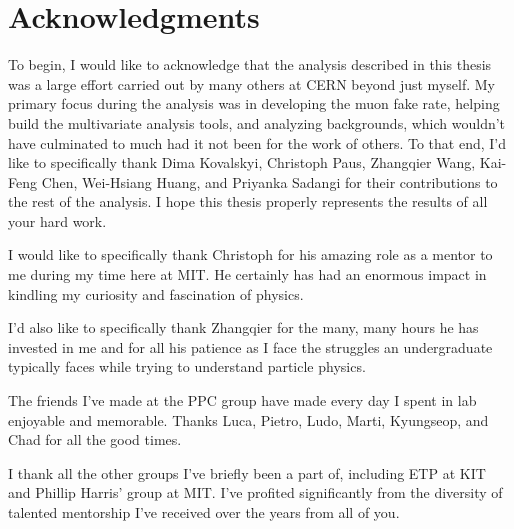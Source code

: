 


\chapter*{Acknowledgments}

To begin, I would like to acknowledge that the analysis described in this thesis was a large effort carried out by many others at CERN beyond just myself. My primary focus during the analysis was in developing the muon fake rate, helping build the multivariate analysis tools, and analyzing backgrounds, which wouldn't have culminated to much had it not been for the work of others. To that end, I'd like to specifically thank Dima Kovalskyi, Christoph Paus, Zhangqier Wang, Kai-Feng Chen, Wei-Hsiang Huang, and Priyanka Sadangi for their contributions to the rest of the analysis. I hope this thesis properly represents the results of all your hard work. 

\vspace{5mm}

I would like to specifically thank Christoph for his amazing role as a mentor to me during my time here at MIT. He certainly has had an enormous impact in kindling my curiosity and fascination of physics. 

\vspace{5mm}

I'd also like to specifically thank Zhangqier for the many, many hours he has invested in me and for all his patience as I face the struggles an undergraduate typically faces while trying to understand particle physics. 

\vspace{5mm}

The friends I've made at the PPC group have made every day I spent in lab enjoyable and memorable. Thanks Luca, Pietro, Ludo, Marti, Kyungseop, and Chad for all the good times.

\vspace{5mm}

I thank all the other groups I've briefly been a part of, including ETP at KIT and Phillip Harris' group at MIT. I've profited significantly from the diversity of talented mentorship I've received over the years from all of you.


